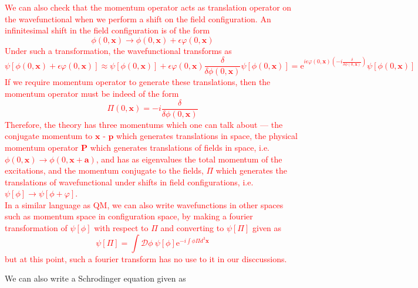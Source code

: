 \documentclass[11pt, notitlepage]{report}
\newcommand{\e}{\mathrm{e}}
\newcommand{\D}{\mathcal{D}}
\numberwithin{equation}{section}
\begin{document}
    \textcolor{red}{
        We can also check that the momentum operator acts as translation operator on the wavefunctional when we perform a shift on the field configuration. An infinitesimal shift in the field configuration is of the form 
        \begin{equation}
            \phi(0, \textbf{x}) \to \phi(0, \textbf{x}) + \epsilon \varphi(0, \textbf{x})
        \end{equation}
        Under such a transformation, the wavefunctional transforms as 
        \begin{equation}
            \psi[\phi(0, \textbf{x}) + \epsilon \varphi(0, \textbf{x})] \approx \psi[\phi(0, \textbf{x})] + \epsilon \varphi(0, \textbf{x})\frac{\delta }{\delta  \phi(0, \textbf{x})}\psi[\phi(0, \textbf{x})] = \e^{i\epsilon\varphi(0, \textbf{x}) \left( -i\frac{\delta}{\delta \phi(0, \textbf{x})} \right)}\psi[\phi(0, \textbf{x})]
        \end{equation}
        If we require momentum operator to generate these translations, then the momentum operator must be indeed of the form 
        \begin{equation}
            \Pi(0, \textbf{x}) = -i\frac{\delta}{\delta \phi(0, \textbf{x})}
        \end{equation}
        Therefore, the theory has three momentums which one can talk about — the conjugate momentum to \(\textbf{x}\) - \(\textbf{p}\) which generates translations in space, the physical momentum operator \(\textbf{P}\) which generates translations of fields in space, i.e. \(\phi(0, \textbf{x}) \to \phi(0, \textbf{x} + \textbf{a})\), and has as eigenvalues the total momentum of the excitations, and the momentum conjugate to the fields, \(\Pi\) which generates the translations of wavefunctional under shifts in field configurations, i.e. \(\psi[\phi] \to \psi[\phi + \varphi]\).\\
        In a similar language as QM, we can also write wavefunctions in other spaces such as momentum space in configuration space, by making a fourier transformation of \(\psi[\phi]\) with respect to \(\Pi\) and converting to \(\psi[\Pi]\) given as 
        \begin{equation}
            \psi[\Pi] = \int \D \phi ~\psi[\phi] \e^{-i\int \phi \Pi d^3\textbf{x}}
        \end{equation}
        but at this point, such a fourier transform has no use to it in our disccussions.\\
    }

    We can also write a Schrodinger equation given as 
\end{document}
